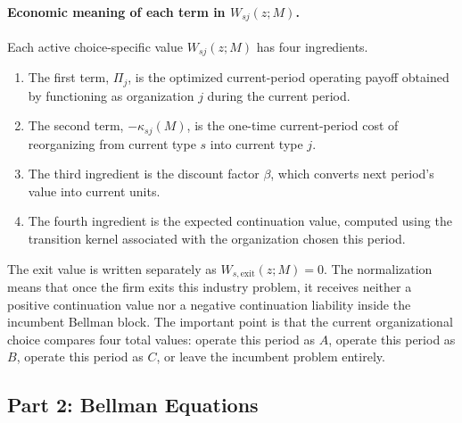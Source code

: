 \paragraph{Economic meaning of each term in $W_{sj}(z;M)$.}
Each active choice-specific value $W_{sj}(z;M)$ has four ingredients.
\begin{enumerate}
    \item The first term, $\Pi_j$, is the optimized current-period operating payoff obtained by functioning as organization $j$ during the current period.
    \item The second term, $-\kappa_{sj}(M)$, is the one-time current-period cost of reorganizing from current type $s$ into current type $j$.
    \item The third ingredient is the discount factor $\beta$, which converts next period's value into current units.
    \item The fourth ingredient is the expected continuation value, computed using the transition kernel associated with the organization chosen this period.
\end{enumerate}
The exit value is written separately as $W_{s,\mathrm{exit}}(z;M)=0$. The normalization means that once the firm exits this industry problem, it receives neither a positive continuation value nor a negative continuation liability inside the incumbent Bellman block. The important point is that the current organizational choice compares four total values: operate this period as $A$, operate this period as $B$, operate this period as $C$, or leave the incumbent problem entirely.

\subsection{Part 2: Bellman Equations}

